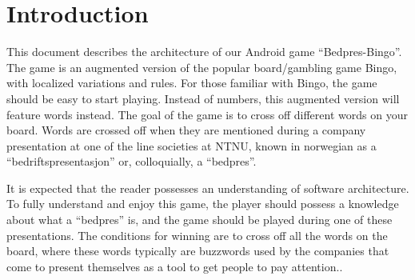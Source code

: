 \section{Introduction}
\label{sec:introduction}
This document describes the architecture of our Android game ``Bedpres-Bingo''.
The game is an augmented version of the popular board/gambling game Bingo,
with localized variations and rules. For those familiar with Bingo,
the game should be easy to start playing. Instead of numbers, this augmented
version will feature words instead. The goal of the game is to cross off
different words on your board. Words are crossed off when they are mentioned
during a company presentation at one of the line societies at NTNU, known in
norwegian as a ``bedriftspresentasjon'' or, colloquially, a ``bedpres''.

It is expected that the reader possesses an understanding of software
architecture. To fully understand and enjoy this game, the player should
possess a knowledge about what a ``bedpres'' is, and the game should be played
during one of these presentations. The conditions for winning are to cross off
all the words on the board, where these words typically are buzzwords used by
the companies that come to present themselves as a tool to get people to pay
attention..